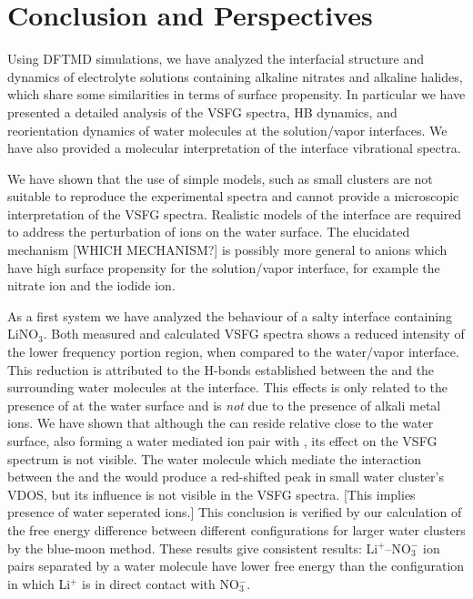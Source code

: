 \chapter{Conclusion and Perspectives}\label{CHAPTER_Summary}
Using DFTMD simulations, we have analyzed the interfacial structure and dynamics of electrolyte solutions containing alkaline nitrates and alkaline halides,
which share some similarities in terms of surface propensity.
In particular we have presented a detailed analysis of the VSFG spectra, HB dynamics, and reorientation dynamics of water molecules at the solution/vapor interfaces. 
We have also provided a molecular interpretation of the interface vibrational spectra. 

We have shown that the use of simple models, such as small clusters are not suitable to reproduce the experimental spectra 
and cannot provide a microscopic interpretation of the VSFG spectra. Realistic models of the interface are required to address the 
perturbation of ions on the water surface. The elucidated mechanism [WHICH MECHANISM?] is possibly more general to anions which have high 
surface propensity for the solution/vapor interface, for example the nitrate ion and the iodide ion.

As a first system we have analyzed the behaviour of a salty interface containing LiNO$_3$.
Both measured and calculated VSFG spectra shows a reduced intensity of the lower frequency portion region, 
when compared to the water/vapor interface. 
This reduction is attributed to the H-bonds established between the \nitrate and the surrounding water molecules at the interface.
This effects is only related to the presence of \nitrate at the water surface and is \emph{not} due to the presence of alkali metal ions.
We have shown that although the \Li can reside relative close to the water surface, also forming a water mediated
ion pair with \nit, its effect on the VSFG spectrum is not visible. The water molecule which mediate the interaction 
between the \nitrate and the \Li would produce a red-shifted peak in small water cluster's VDOS, but its influence is not visible 
in the VSFG spectra. [This implies presence of water seperated ions.] 
This conclusion is verified by our calculation of the free energy difference between different configurations for 
larger water clusters by the blue-moon method. These results give consistent results: Li$^+$--NO$_3^-$ ion pairs 
separated by a water molecule have lower free energy than the configuration in which Li$^+$ is in direct contact with NO$_3^-$. 

